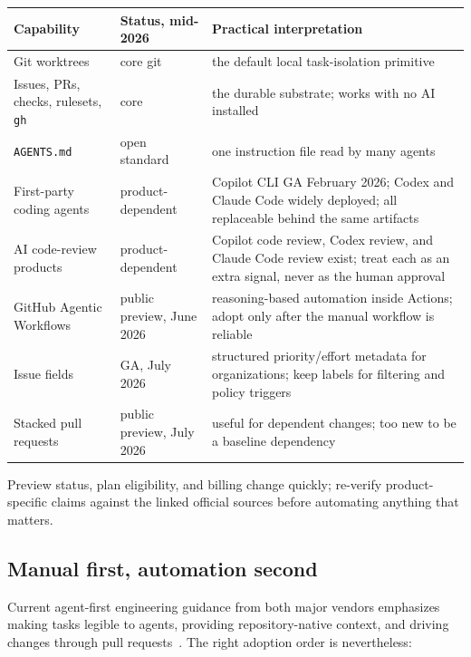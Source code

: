 \documentclass[11pt]{article}
\newcommand{\co}[1]{\lstinline[basicstyle=\ttfamily\color{gwInk}]{#1}}
\begin{document}
\begin{center}
\begin{tabularx}{\textwidth}{@{}l l Y@{}}
\toprule
\textbf{Capability} & \textbf{Status, mid-2026} & \textbf{Practical interpretation} \\
\midrule
Git worktrees & core git & the default local task-isolation
  primitive~\cite{git2026worktree} \\
Issues, PRs, checks, rulesets, \co{gh} & core & the durable substrate; works with no AI
  installed~\cite{github2026flow,github2026cli} \\
\co{AGENTS.md} & open standard & one instruction file read by many
  agents~\cite{agentsmd2026} \\
First-party coding agents & product-dependent & Copilot CLI GA February 2026; Codex and Claude
  Code widely deployed; all replaceable behind the same
  artifacts~\cite{github2026copilotcli} \\
AI code-review products & product-dependent & Copilot code review, Codex review, and Claude
  Code review exist; treat each as an extra signal, never as the human
  approval~\cite{github2026thirdparty,anthropic2026actions} \\
GitHub Agentic Workflows & public preview, June 2026 & reasoning-based automation inside
  Actions; adopt only after the manual workflow is reliable~\cite{github2026agenticwf} \\
Issue fields & GA, July 2026 & structured priority/effort metadata for organizations;
  keep labels for filtering and policy triggers~\cite{github2026issuefields} \\
Stacked pull requests & public preview, July 2026 & useful for dependent changes; too new to be
  a baseline dependency~\cite{github2026stacked} \\
\bottomrule
\end{tabularx}
\end{center}

Preview status, plan eligibility, and billing change quickly; re-verify product-specific claims
against the linked official sources before automating anything that matters.

\subsection{Manual first, automation second}

Current agent-first engineering guidance from both major vendors emphasizes making tasks legible
to agents, providing repository-native context, and driving changes through pull
requests~\cite{openai2026harness,github2026agenticwf}. The right adoption order is nevertheless:
\end{document}
